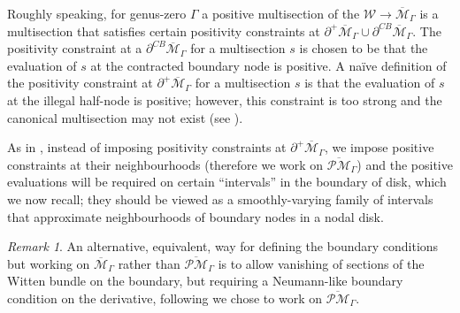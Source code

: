 \documentclass[11pt]{amsart}
\theoremstyle{definition}
\theoremstyle{remark}
\newtheorem{rmk}[dummy]{Remark}
\newcommand{\oPMb}{{\overline{\mathcal{PM}}}}
\newcommand{\<}{\left<}
\renewcommand{\>}{\right>}
\numberwithin{equation}{section}
\def\Mbar{{\overline{\mathcal M}}}
\begin{document}
Roughly speaking, for genus-zero $\Gamma$ a positive multisection of the  $\mathcal W\to \Mbar_\Gamma$ is a multisection that satisfies certain positivity constraints at $\partial^+\Mbar_\Gamma\cup \partial^{CB}\Mbar_\Gamma$.  The positivity constraint at a $\partial^{CB}\Mbar_\Gamma$ for a multisection $s$ is chosen to be that the evaluation of $s$ at the contracted boundary node is positive. A na\"ive definition of the positivity constraint at $\partial^+\Mbar_\Gamma$ for a multisection $s$ is that the evaluation of $s$ at the illegal half-node is positive; however, this constraint is too strong and the canonical multisection may %
not exist (see \cite[Example 3.23]{BCT2}).

As %
in \cite{BCT2}, instead of imposing 
positivity constraints at $\partial^+\Mbar_\Gamma$, we impose positive constraints at their neighbourhoods (therefore we work on $\oPMb_\Gamma$) and the positive evaluations will be required on certain ``intervals'' in the boundary of disk, which we now recall; they should be viewed as a smoothly-varying family of intervals that approximate  neighbourhoods of boundary nodes in a nodal disk. 

\begin{rmk}
An alternative, equivalent, way %
for defining the boundary conditions but working on $\Mbar_{\Gamma}$ rather than $\oPMb_{\Gamma}$ is to allow vanishing of sections of the Witten bundle on %
the boundary, but %
requiring a Neumann-like boundary condition on %
the derivative, following \cite{BCT2}
 we %
chose to work on $\oPMb_{\Gamma}.$\end{rmk}
\end{document}
